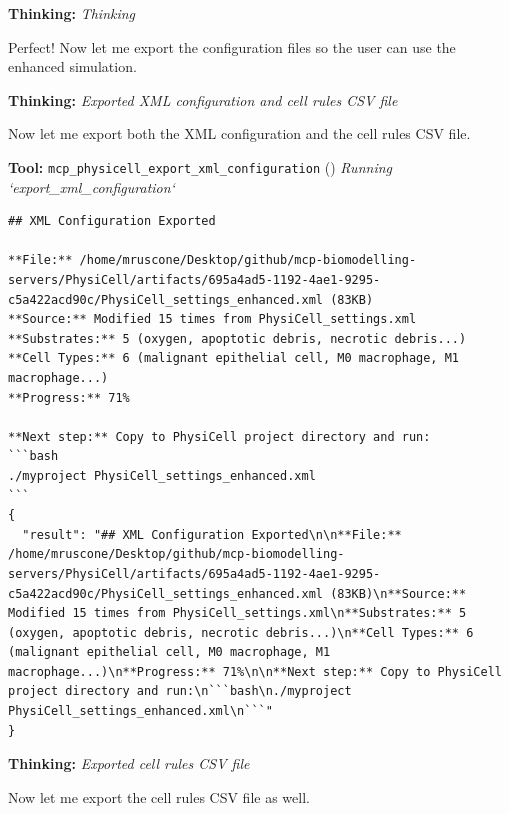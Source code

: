 \documentclass[11pt,a4paper]{article}
\begin{document}
\begin{thinkbox}
\textbf{Thinking:} \textit{Thinking}

Perfect! Now let me export the configuration files so the user can use the enhanced simulation.

\end{thinkbox}
\begin{thinkbox}
\textbf{Thinking:} \textit{Exported XML configuration and cell rules CSV file}

Now let me export both the XML configuration and the cell rules CSV file.

\end{thinkbox}
\begin{toolokbox}
\textbf{Tool:} \texttt{mcp\_physicell\_export\_xml\_configuration} (\checkmark)
\textit{Running `export\_xml\_configuration`}
\begin{lstlisting}
## XML Configuration Exported

**File:** /home/mruscone/Desktop/github/mcp-biomodelling-servers/PhysiCell/artifacts/695a4ad5-1192-4ae1-9295-c5a422acd90c/PhysiCell_settings_enhanced.xml (83KB)
**Source:** Modified 15 times from PhysiCell_settings.xml
**Substrates:** 5 (oxygen, apoptotic debris, necrotic debris...)
**Cell Types:** 6 (malignant epithelial cell, M0 macrophage, M1 macrophage...)
**Progress:** 71%

**Next step:** Copy to PhysiCell project directory and run:
```bash
./myproject PhysiCell_settings_enhanced.xml
```
{
  "result": "## XML Configuration Exported\n\n**File:** /home/mruscone/Desktop/github/mcp-biomodelling-servers/PhysiCell/artifacts/695a4ad5-1192-4ae1-9295-c5a422acd90c/PhysiCell_settings_enhanced.xml (83KB)\n**Source:** Modified 15 times from PhysiCell_settings.xml\n**Substrates:** 5 (oxygen, apoptotic debris, necrotic debris...)\n**Cell Types:** 6 (malignant epithelial cell, M0 macrophage, M1 macrophage...)\n**Progress:** 71%\n\n**Next step:** Copy to PhysiCell project directory and run:\n```bash\n./myproject PhysiCell_settings_enhanced.xml\n```"
}
\end{lstlisting}
\end{toolokbox}
\begin{thinkbox}
\textbf{Thinking:} \textit{Exported cell rules CSV file}

Now let me export the cell rules CSV file as well.

\end{thinkbox}
\end{document}
